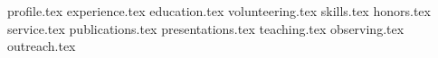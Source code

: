 \documentclass[11pt, a4paper]{awesome-cv}
\newcommand*{\sectiondir}{resume/}
\begin{document}
\makecvheader

{profile.tex} \vspace{-15pt}
{experience.tex} \vspace{-15pt}
{education.tex} \vspace{-15pt}
{volunteering.tex} \vspace{-15pt}
{skills.tex}  \vspace{-15pt}
{honors.tex} 
{service.tex} \vspace{-15pt}
\clearpage
{publications.tex}
\clearpage
{presentations.tex}
{teaching.tex}
\clearpage
{observing.tex}
{outreach.tex}
\end{document}
